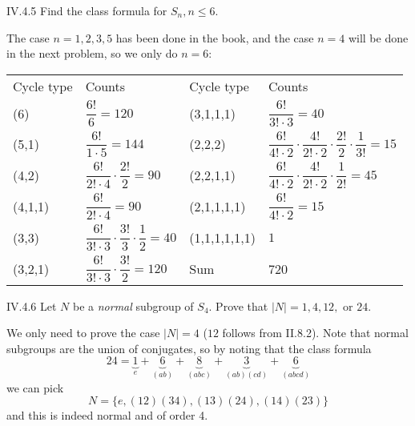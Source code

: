 \begin{problem}{IV.4.5}
Find the class formula for $S_n, n \leq 6$.
\end{problem}
\begin{sol}
The case $n = 1,2,3,5$ has been done in the book, and the case $n=4$ will be done in the next problem, so we only do $n = 6$:
\begin{center}
\begin{tabular}{l|l|l|l}
Cycle type & Counts &Cycle type & Counts \\
(6) & $\dfrac{6!}{6} = 120$ &(3,1,1,1) &$\dfrac{6!}{3! \cdot 3} = 40$ \\[8pt]
(5,1) &$\dfrac{6!}{1 \cdot 5} = 144$ & (2,2,2) &$\dfrac{6!}{4!\cdot 2} \cdot \dfrac{4!}{2!\cdot 2} \cdot \dfrac{2!}{2} \cdot \dfrac{1}{3!} = 15$ \\[8pt]
(4,2) &$\dfrac{6!}{2! \cdot 4} \cdot \dfrac{2!}{2} = 90$ &(2,2,1,1) &$\dfrac{6!}{4!\cdot 2} \cdot \dfrac{4!}{2!\cdot 2} \cdot \dfrac{1}{2!} = 45$ \\[8pt]
(4,1,1) &$\dfrac{6!}{2! \cdot 4} = 90$ &(2,1,1,1,1) &$\dfrac{6!}{4!\cdot 2} = 15$ \\[8pt]
(3,3) &$\dfrac{6!}{3! \cdot 3} \cdot \dfrac{3!}{3} \cdot \dfrac{1}{2} = 40$ &(1,1,1,1,1,1) &$1$ \\[8pt]
(3,2,1) &$\dfrac{6!}{3! \cdot 3} \cdot \dfrac{3!}{2} = 120$ &Sum &720

\end{tabular}	
\end{center}

\end{sol}

\begin{problem}{IV.4.6}
Let $N$ be a \emph{normal} subgroup of $S_4$. Prove that $|N| = 1,4,12,$ or $24$. 
\end{problem}
\begin{pf}
We only need to prove the case $|N|=4$ ($12$ follows from II.8.2). Note that normal subgroups are the union of conjugates, so by noting that the class formula 
\[
24 = \underbrace{1}_e + \underbrace{6}_{(a b)} + \underbrace{8}_{(a b c)} + \underbrace{3}_{(a b)(c d)} + \underbrace{6}_{(a b c d)}
\]
we can pick
\[
N = \{e, (1 2)(3 4), (1 3)(2 4), (1 4)(2 3)\}	
\]
and this is indeed normal and of order 4.
\end{pf}


